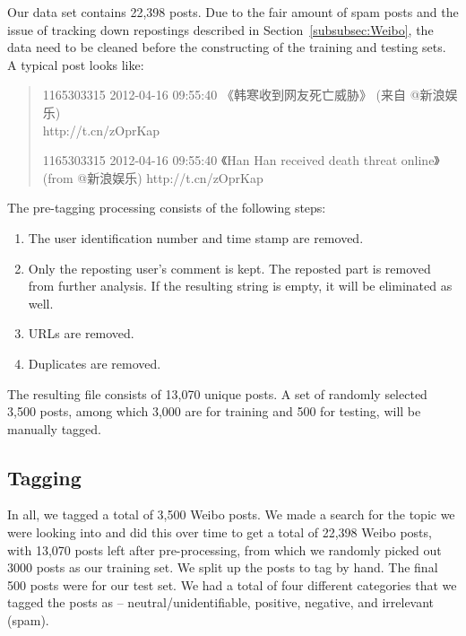 \documentclass[11pt]{article}
\newcommand{\1}[1]{{\mathbf 1}\left\{#1\right\}}        %
\begin{document}
Our data set contains 22,398 posts. 
Due to the fair amount of spam posts and the issue of tracking down repostings described in Section~\ref{subsubsec:Weibo}, the data need to be cleaned before the constructing of the training and testing sets.
A typical post looks like:
\begin{quote}
1165303315 2012-04-16 09:55:40  《韩寒收到网友死亡威胁》 (来自 @新浪娱乐) \\ 
http://t.cn/zOprKap

1165303315 2012-04-16 09:55:40  《Han Han received death threat online》 (from @新浪娱乐) http://t.cn/zOprKap
\end{quote} 
The pre-tagging processing consists of the following steps:
\begin{enumerate}
\item The user identification number and time stamp are removed.
\item Only the reposting user's comment is kept. The reposted part is removed from further analysis. If the resulting string is empty, it will be eliminated as well.
\item URLs are removed.
\item Duplicates are removed.
\end{enumerate}

The resulting file consists of 13,070 unique posts. A set of randomly selected 3,500 posts, among which 3,000 are for training and 500 for testing, will be manually tagged.



\subsection{Tagging}


In all, we tagged a total of 3,500 Weibo posts.  We made a search for the topic we were looking into and did this over time to get a total of 22,398 Weibo posts, with 13,070 posts left after pre-processing, from which we randomly picked out 3000 posts as our training set.  We split up the posts to tag by hand.  The final 500 posts were for our test set. We had a total of four different categories that we tagged the posts as -- neutral/unidentifiable, positive, negative, and irrelevant (spam).  
\end{document}
